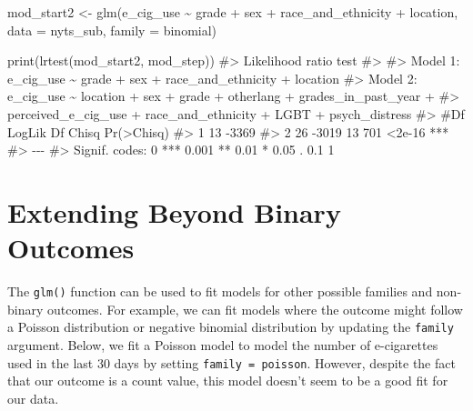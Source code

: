 \documentclass[
  letterpaper,
]{krantz}
\makeatletter
\newenvironment{Shaded}{\begin{snugshade}}{\end{snugshade}}
\newcommand{\AttributeTok}[1]{\textcolor[rgb]{0.40,0.45,0.13}{#1}}
\newcommand{\CommentTok}[1]{\textcolor[rgb]{0.37,0.37,0.37}{#1}}
\newcommand{\FunctionTok}[1]{\textcolor[rgb]{0.28,0.35,0.67}{#1}}
\newcommand{\NormalTok}[1]{\textcolor[rgb]{0.00,0.23,0.31}{#1}}
\newcommand{\OtherTok}[1]{\textcolor[rgb]{0.00,0.23,0.31}{#1}}
\newcommand{\SpecialCharTok}[1]{\textcolor[rgb]{0.37,0.37,0.37}{#1}}
\newenvironment{kframe}{%
\medskip{}
\setlength{\fboxsep}{.8em}
 \def\at@end@of@kframe{}%
 \ifinner\ifhmode%
  \def\at@end@of@kframe{\end{minipage}}%
  \begin{minipage}{\columnwidth}%
 \fi\fi%
 \def\FrameCommand##1{\hskip\@totalleftmargin \hskip-\fboxsep
 \colorbox{shadecolor}{##1}\hskip-\fboxsep
     \hskip-\linewidth \hskip-\@totalleftmargin \hskip\columnwidth}%
 \MakeFramed {\advance\hsize-\width
   \@totalleftmargin\z@ \linewidth\hsize
   \@setminipage}}%
 {\par\unskip\endMakeFramed%
 \at@end@of@kframe}
\renewenvironment{Shaded}{\begin{kframe}}{\end{kframe}}
\makeatother
\begin{document}
\begin{Shaded}
\begin{Highlighting}[]
\NormalTok{mod\_start2 }\OtherTok{\textless{}{-}} \FunctionTok{glm}\NormalTok{(e\_cig\_use }\SpecialCharTok{\textasciitilde{}}\NormalTok{ grade }\SpecialCharTok{+}\NormalTok{ sex }\SpecialCharTok{+}\NormalTok{ race\_and\_ethnicity }\SpecialCharTok{+}\NormalTok{ location,}
                 \AttributeTok{data =}\NormalTok{ nyts\_sub, }\AttributeTok{family =}\NormalTok{ binomial)}
\end{Highlighting}
\end{Shaded}

\begin{Shaded}
\begin{Highlighting}[]
\FunctionTok{print}\NormalTok{(}\FunctionTok{lrtest}\NormalTok{(mod\_start2, mod\_step))}
\CommentTok{\#\textgreater{} Likelihood ratio test}
\CommentTok{\#\textgreater{} }
\CommentTok{\#\textgreater{} Model 1: e\_cig\_use \textasciitilde{} grade + sex + race\_and\_ethnicity + location}
\CommentTok{\#\textgreater{} Model 2: e\_cig\_use \textasciitilde{} location + sex + grade + otherlang + grades\_in\_past\_year + }
\CommentTok{\#\textgreater{}     perceived\_e\_cig\_use + race\_and\_ethnicity + LGBT + psych\_distress}
\CommentTok{\#\textgreater{}   \#Df LogLik Df Chisq Pr(\textgreater{}Chisq)    }
\CommentTok{\#\textgreater{} 1  13  {-}3369                        }
\CommentTok{\#\textgreater{} 2  26  {-}3019 13   701     \textless{}2e{-}16 ***}
\CommentTok{\#\textgreater{} {-}{-}{-}}
\CommentTok{\#\textgreater{} Signif. codes:  0 \textquotesingle{}***\textquotesingle{} 0.001 \textquotesingle{}**\textquotesingle{} 0.01 \textquotesingle{}*\textquotesingle{} 0.05 \textquotesingle{}.\textquotesingle{} 0.1 \textquotesingle{} \textquotesingle{} 1}
\end{Highlighting}
\end{Shaded}

\hypertarget{extending-beyond-binary-outcomes}{%
\section{Extending Beyond Binary
Outcomes}\label{extending-beyond-binary-outcomes}}

The \texttt{glm()} function can be used to fit models for other possible
families and non-binary outcomes. For example, we can fit models where
the outcome might follow a Poisson distribution or negative binomial
distribution by updating the \texttt{family} argument. Below, we fit a
Poisson model to model the number of e-cigarettes used in the last 30
days by setting \texttt{family\ =\ poisson}. However, despite the fact
that our outcome is a count value, this model doesn't seem to be a good
fit for our data.
\end{document}
